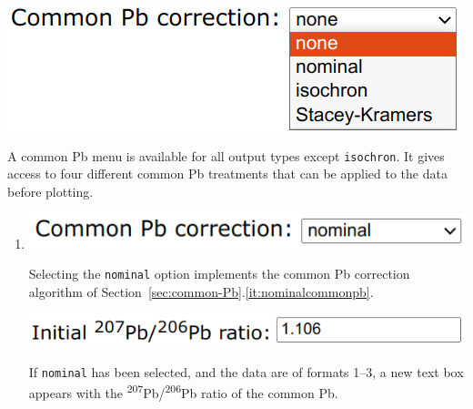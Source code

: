 \begin{refsection}
\begin{enumerate}
\noindent\begin{minipage}[t]{.4\linewidth}
\strut\vspace*{-\baselineskip}\newline
\includegraphics[width=\linewidth]{../figures/CommonPb.png}
\end{minipage}
\begin{minipage}[t]{.6\linewidth}
  A common Pb menu is available for all output types except
  \texttt{isochron}. It gives access to four different common Pb
  treatments that can be applied to the data before plotting.
\end{minipage}

\begin{enumerate}
\item\begin{minipage}[t]{.4\linewidth}
  \strut\vspace*{-\baselineskip}\newline
  \includegraphics[width=\linewidth]{../figures/nominalcommonpb.png}
  \end{minipage}
  \begin{minipage}[t]{.6\linewidth}
    Selecting the \texttt{nominal} option implements the common Pb
    correction algorithm of
    Section~\ref{sec:common-Pb}.\ref{it:nominalcommonpb}.\\
  \end{minipage}

  \noindent\begin{minipage}[t]{.43\linewidth}
  \strut\vspace*{-\baselineskip}\newline
  \includegraphics[width=\linewidth]{../figures/initialPb76.png}
  \end{minipage}
  \begin{minipage}[t]{.57\linewidth}
    If \texttt{nominal} has been selected, and the data are of formats
    1--3, a new text box appears with the
    \textsuperscript{207}Pb/\textsuperscript{206}Pb ratio of the
    common Pb.\\
  \end{minipage}


\end{enumerate}
\end{enumerate}
\end{refsection}
